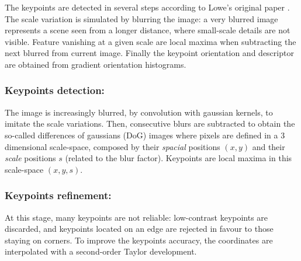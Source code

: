 \documentclass[preprint]{iucr}
\begin{document}
The keypoints are detected in several steps according to Lowe's
original paper \cite{Lowe99}.
The scale variation is simulated by blurring the image:
a very blurred image represents a scene seen from a longer distance, where
small-scale details are not visible. Feature vanishing at a given scale are
local maxima when subtracting the next blurred from current image. Finally the
keypoint orientation and descriptor are obtained from gradient orientation
histograms.


\subsubsection{Keypoints detection:}

The image is increasingly blurred, by convolution with gaussian kernels, to
imitate the scale variations.
Then, consecutive blurs are subtracted to obtain the so-called differences of
gaussians (DoG) images where pixels are defined in a 3 dimensional
scale-space, composed by  their \emph{spacial} positions $(x, y)$ and their
\emph{scale} positions $s$ (related to the blur factor). Keypoints are
local maxima in this scale-space $(x, y, s)$.



\subsubsection{Keypoints refinement:}

At this stage, many keypoints are not reliable: low-contrast keypoints are
discarded, and keypoints located on an edge are rejected in favour to those
staying on corners.
To improve the keypoints accuracy, the coordinates are interpolated with a
second-order Taylor development.
\end{document}
